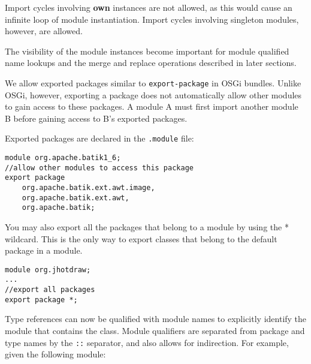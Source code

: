 Import cycles involving \textbf{own} instances are not allowed, as this would 
cause an infinite loop of module instantiation. Import cycles involving
singleton modules, however, are allowed.

The visibility of the module instances become important for module
qualified name lookups and the merge and replace operations described in later
sections.


We allow exported packages similar to {\tt export-package} in OSGi bundles. Unlike OSGi, however,
exporting a package does not automatically allow other modules to gain
access to these packages. A module A must first import another module B
before gaining access to B's exported packages.

Exported packages are declared in the {\tt .module} file:

\begin{lstlisting}
module org.apache.batik1_6;
//allow other modules to access this package
export package 
	org.apache.batik.ext.awt.image,
	org.apache.batik.ext.awt,
	org.apache.batik;
\end{lstlisting}

You may also export all the packages that belong to a module by using
the * wildcard. This is the only way to export classes that belong to
the default package in a module.

\begin{lstlisting}
module org.jhotdraw;
...
//export all packages
export package *;
\end{lstlisting}




Type references can now be qualified with module names to explicitly
identify the module that contains the class. Module qualifiers
are separated from package and type names by the \texttt{::} separator,
and also allows for indirection. For example, given the following module:

